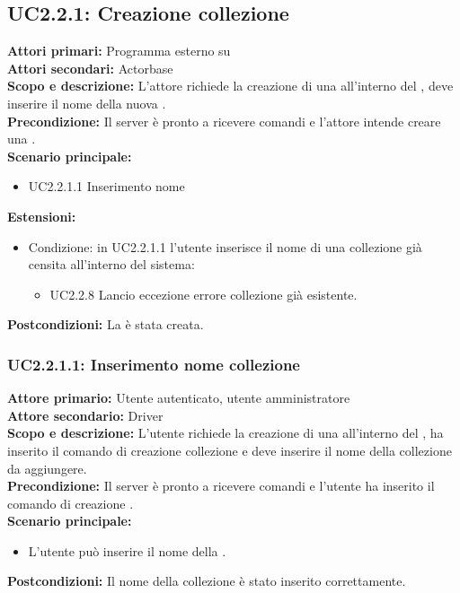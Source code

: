 \documentclass{scalatekids-article}
\begin{document}
\subsection{UC2.2.1: Creazione collezione}

\textbf{Attori primari:} Programma esterno su \\
\textbf{Attori secondari:} Actorbase\\
\textbf{Scopo e descrizione:} L'attore richiede la creazione di una  all'interno del , deve inserire il nome della nuova .\\
\textbf{Precondizione:} Il server è pronto a ricevere comandi e l'attore intende creare una .\\
\textbf{Scenario principale:}
\begin{itemize}
\item UC2.2.1.1 Inserimento nome 
\end{itemize}
\textbf{Estensioni:}
\begin{itemize}
\item Condizione: in UC2.2.1.1 l'utente inserisce il nome di una collezione già censita all'interno del sistema:
  \begin{itemize}
  \item UC2.2.8 Lancio eccezione errore collezione già esistente.
  \end{itemize}
\end{itemize}
\textbf{Postcondizioni:} La  è stata creata.

\subsubsection{UC2.2.1.1: Inserimento nome collezione}

\textbf{Attore primario:} Utente autenticato, utente amministratore\\
\textbf{Attore secondario:} Driver\\
\textbf{Scopo e descrizione:} L'utente richiede la creazione di una  all'interno del , ha inserito il comando di creazione collezione e deve inserire il nome della collezione da aggiungere.\\
\textbf{Precondizione:} Il server è pronto a ricevere comandi e l'utente ha inserito il comando di creazione .\\
\textbf{Scenario principale:}
\begin{itemize}
\item L'utente può inserire il nome della .
\end{itemize}
\textbf{Postcondizioni:} Il nome della collezione è stato inserito correttamente.
\end{document}
